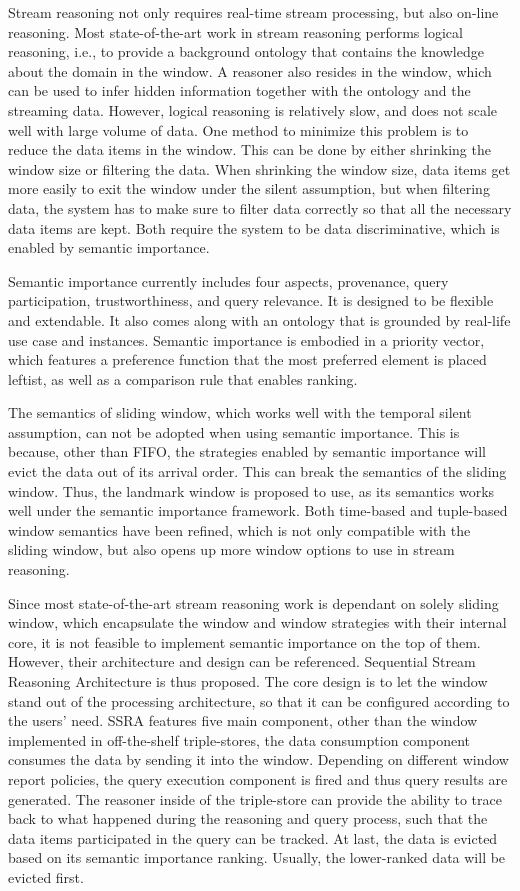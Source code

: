 Stream reasoning not only requires real-time stream processing, but also on-line reasoning.
Most state-of-the-art work in stream reasoning performs logical reasoning, i.e., to provide a background ontology that contains the knowledge about the domain in the window.
A reasoner also resides in the window, which can be used to infer hidden information together with the ontology and the streaming data. 
However, logical reasoning is relatively slow, and does not scale well with large volume of data. 
One method to minimize this problem is to reduce the data items in the window. 
This can be done by either shrinking the window size or filtering the data. 
When shrinking the window size, data items get more easily to exit the window under the silent assumption, but when filtering data, the system has to make sure to filter data correctly so that all the necessary data items are kept. 
Both require the system to be data discriminative, which is enabled by semantic importance. 

Semantic importance currently includes four aspects, provenance, query participation, trustworthiness, and query relevance. 
It is designed to be flexible and extendable. 
It also comes along with an ontology that is grounded by real-life use case and instances.
Semantic importance is embodied in a priority vector, which features a preference function that the most preferred element is placed leftist, as well as a comparison rule that enables ranking.

The semantics of sliding window, which works well with the temporal silent assumption, can not be adopted when using semantic importance. 
This is because, other than FIFO, the strategies enabled by semantic importance will evict the data out of its arrival order.
This can break the semantics of the sliding window.
Thus, the landmark window is proposed to use, as its semantics works well under the semantic importance framework. 
Both time-based and tuple-based window semantics have been refined, which is not only compatible with the sliding window, but also opens up more window options to use in stream reasoning. 

Since most state-of-the-art stream reasoning work is dependant on solely sliding window, which encapsulate the window and window strategies with their internal core, it is not feasible to implement semantic importance on the top of them. 
However, their architecture and design can be referenced. 
Sequential Stream Reasoning Architecture is thus proposed. 
The core design is to let the window stand out of the processing architecture, so that it can be configured according to the users' need. 
SSRA features five main component, other than the window implemented in off-the-shelf triple-stores, the data consumption component consumes the data by sending it into the window. 
Depending on different window report policies, the query execution component is fired and thus query results are generated. 
The reasoner inside of the triple-store can provide the ability to trace back to what happened during the reasoning and query process, such that the data items participated in the query can be tracked.
At last, the data is evicted based on its semantic importance ranking.
Usually, the lower-ranked data will be evicted first. 

